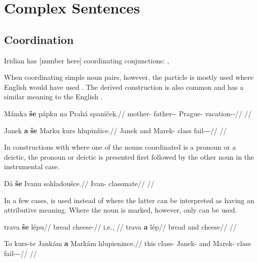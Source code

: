 \chapter{Complex Sentences}

\section{Coordination} 

Iridian has [number here] coordinating conjunctions: ,

When coordinating simple noun pairs, however, the particle  is mostly used where English would have used . The derived construction  is also common and has a similar meaning to the English .

\pex
\begingl
    \gla Mámka \textbf{še} pápku na Prahá spaníček.//
    \glb mother-\Dim{} \Com{} father-\Dim{}-\Ins{} \Loc{} Prague-\Pat{} vacation-\Av{}-\Pf{}//
    \glft {}//
\endgl
\xe

\pex
\begingl
    \gla Janek \textbf{a} \textbf{še} Marku kurs hlupinžice.//
    \glb Janek and \Com{} Marek-\Ins{} class fail-\Av{}-\Pf{}-\Quot{}//
    \glft {}//
\endgl
\xe

In constructions with  where one of the nouns coordinated is a pronoun or a deictic, the pronoun or deictic is presented first followed by the other noun in the instrumental case.

\pex
\begingl
    \gla Dá \textbf{še} Ivanu sohladoušce.//
    \glb {} \Com{} Ivan-\Ins{} classmate//
    \glft {}//
\endgl
\xe

In a few cases,  is used instead of  where the latter can be interpreted as having an attributive meaning. Where the noun is marked, however, only  can be used.

\pex
\a
\begingl
    \gla trava \textbf{še} lépu//
    \glb bread \Com{} cheese-\Ins{}//
    \glft {} i.e., //
\endgl
\a
\begingl
    \gla trava \textbf{a} lép//
    \glb bread and cheese//
    \glft {}//
\endgl
\xe

\pex
\begingl
    \gla To kurs-te Jankám \textbf{a} Markám hlupienince.//
    \glb this class-\Foc{} Janek-\Agt{} and Marek-\Agt{} class fail-\Pv{}-\Pf{}-\Quot{}//
    \glft {}//
\endgl
\xe


